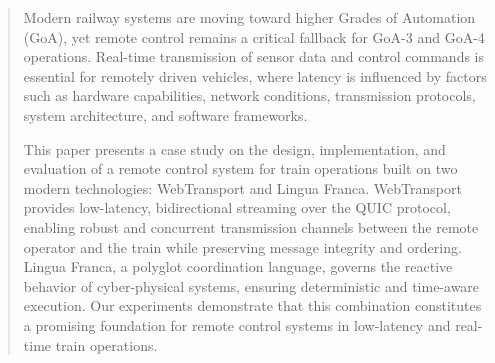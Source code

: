 
\begin{abstract}
    Modern railway systems are moving toward higher Grades of Automation (GoA), yet remote control remains a critical fallback for GoA-3 and GoA-4 operations. Real-time transmission of sensor data and control commands is essential for remotely driven vehicles, where latency is influenced by factors such as hardware capabilities, network conditions, transmission protocols, system architecture, and software frameworks.

    This paper presents a case study on the design, implementation, and evaluation of a remote control system for train operations built on two modern technologies: WebTransport and Lingua Franca. WebTransport provides low-latency, bidirectional streaming over the QUIC protocol, enabling robust and concurrent transmission channels between the remote operator and the train while preserving message integrity and ordering. Lingua Franca, a polyglot coordination language, governs the reactive behavior of cyber-physical systems, ensuring deterministic and time-aware execution. Our experiments demonstrate that this combination constitutes a promising foundation for remote control systems in low-latency and real-time train operations.
\end{abstract}
